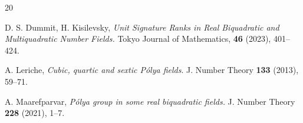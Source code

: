 \documentclass{jams-l}
\theoremstyle{definition}
\theoremstyle{remark}
\numberwithin{equation}{section}
\begin{document}
\begin{thebibliography}{20}

 D. S. Dummit, H. Kisilevsky, \textit{Unit Signature Ranks in Real Biquadratic and Multiquadratic Number Fields.} Tokyo Journal of Mathematics, \textbf{46} (2023), 401--424.









 A. Leriche, \textit{Cubic, quartic and sextic P\'olya fields}. J. Number Theory \textbf{133} (2013), 59--71.





 A. Maarefparvar, \textit{P\'olya group in some real biquadratic fields.} J. Number Theory \textbf{228} (2021), 1--7.


\end{thebibliography}
\end{document}
